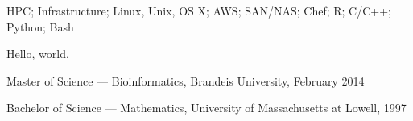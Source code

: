 \documentclass[11pt,article,oneside]{memoir}
\begin{document}
\medskip

\reversemarginpar

\bigskip


\ind HPC; Infrastructure; Linux, Unix, OS X; AWS; SAN/NAS; Chef; R; C/C++; Python; Bash

\bigskip

{}

Hello, world.\\

\bigskip



\ind Master of Science --- Bioinformatics, Brandeis University, February 2014

\ind Bachelor of Science --- Mathematics, University of Massachusetts at Lowell, 1997
\end{document}
